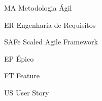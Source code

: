\begin{siglas}
\item[MA] Metodologia Ágil
\item[ER] Engenharia de Requisitos
\item[SAFe] Scaled Agile Framework
\item[EP] Épico
\item[FT] Feature
\item[US] User Story
\end{siglas}
